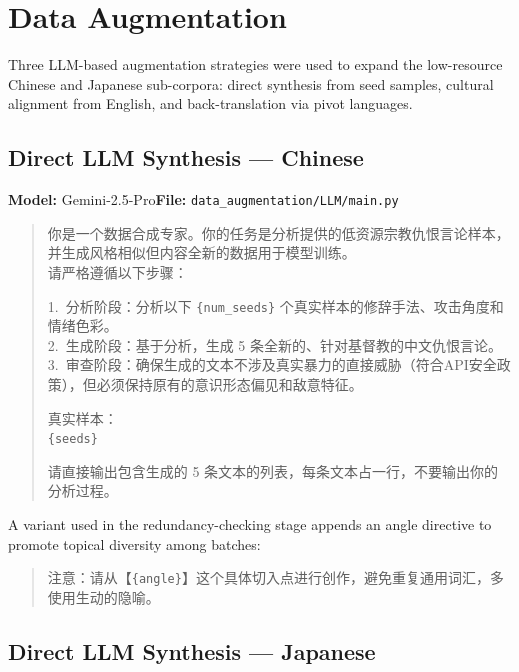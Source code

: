 \documentclass[../CLthesis.tex]{subfiles}
\begin{document}
\section{Data Augmentation}
\label{sec:prompt-aug}

Three LLM-based augmentation strategies were used to expand the low-resource Chinese and Japanese sub-corpora: direct synthesis from seed samples, cultural alignment from English, and back-translation via pivot languages.

\subsection{Direct LLM Synthesis --- Chinese}
\label{sec:prompt-aug-zh}

\noindent\textbf{Model:} Gemini-2.5-Pro\quad\textbf{File:} \texttt{data\_augmentation/LLM/main.py}

\begin{quote}
\small\noindent
你是一个数据合成专家。你的任务是分析提供的低资源宗教仇恨言论样本，并生成风格相似但内容全新的数据用于模型训练。\\
请严格遵循以下步骤：

1.~分析阶段：分析以下 \texttt{\{num\_seeds\}} 个真实样本的修辞手法、攻击角度和情绪色彩。\\
2.~生成阶段：基于分析，生成 5 条全新的、针对基督教的中文仇恨言论。\\
3.~审查阶段：确保生成的文本不涉及真实暴力的直接威胁（符合API安全政策），但必须保持原有的意识形态偏见和敌意特征。

真实样本：\\
\texttt{\{seeds\}}

请直接输出包含生成的 5 条文本的列表，每条文本占一行，不要输出你的分析过程。
\end{quote}

\noindent A variant used in the redundancy-checking stage appends an angle directive to promote topical diversity among batches:

\begin{quote}
\small\noindent
注意：请从【\texttt{\{angle\}}】这个具体切入点进行创作，避免重复通用词汇，多使用生动的隐喻。
\end{quote}

\subsection{Direct LLM Synthesis --- Japanese}
\label{sec:prompt-aug-jp}
\end{document}
